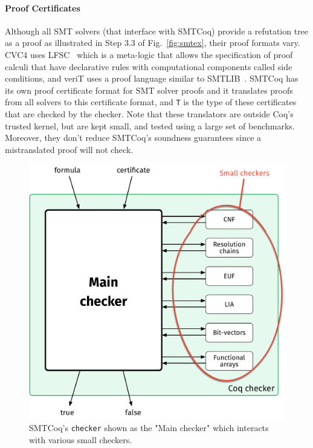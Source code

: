 \documentclass{article}
\begin{document}
	\paragraph{Proof Certificates} Although all 
	SMT solvers (that 
	interface with SMTCoq) provide a
	refutation tree as a proof as 
	illustrated in Step 3.3 of 
	Fig.~\ref{fig:smtex},
	their proof formats vary. CVC4 uses 
	LFSC~\cite{DBLP:journals/fmsd/StumpORHT13}
	which is a meta-logic that allows the 
	specification of proof calculi that have 
	declarative	rules with computational 
	components called side conditions, and 
	veriT uses a proof language similar to 
	SMTLIB~\cite{Besson1}. SMTCoq has its 
	own proof certificate format for SMT 
	solver proofs and it translates proofs 
	from all solvers to this certificate 
	format, and \texttt{T} is the type of 
	these certificates that are 
	checked by the checker. Note 
	that these translators are outside 
	Coq's trusted kernel, but are kept
	small, and tested using a large 
	set of benchmarks. Moreover, they
	don't reduce SMTCoq's soundness
	guarantees since a mistranslated
	proof will not check.
	
	\begin{figure}[t]
		\begin{center}
			\includegraphics[scale=0.3]{checker}
			\caption{SMTCoq's \texttt{checker}
				shown as the "Main checker" which 
				interacts with various small checkers.}
			\label{fig:checker}
		\end{center}
	\end{figure}
	
\end{document}
